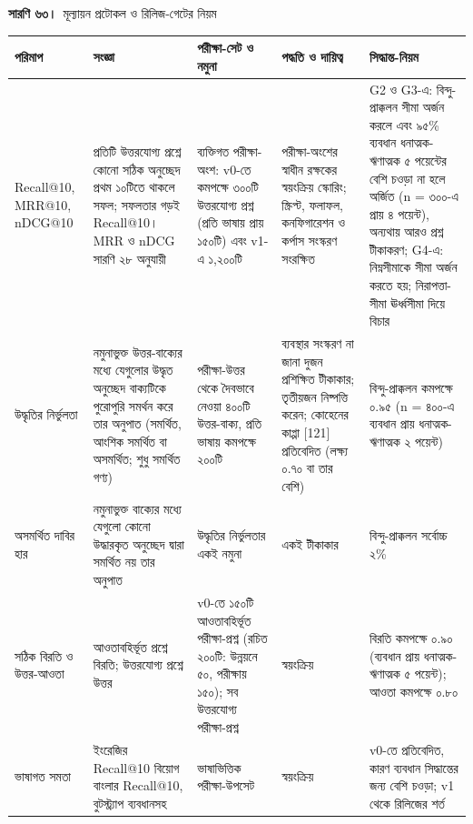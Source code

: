 \documentclass[border=10pt]{standalone}
\begin{document}
\begin{minipage}{17cm}
{\large\bfseries সারণি ৬৩।}\ {\large মূল্যায়ন প্রটোকল ও রিলিজ-গেটের নিয়ম}\par\vspace{7pt}
\small
{}
\begin{tabularx}{\linewidth}{@{}>{\hsize=0.714\hsize\raggedright\arraybackslash}X>{\hsize=1.238\hsize\raggedright\arraybackslash}X>{\hsize=1.048\hsize\raggedright\arraybackslash}X>{\hsize=0.952\hsize\raggedright\arraybackslash}X>{\hsize=1.048\hsize\raggedright\arraybackslash}X@{}}
\arrayrulecolor{bapilrule}\toprule
\rowcolor{white}\textbf{পরিমাপ} & \textbf{সংজ্ঞা} & \textbf{পরীক্ষা-সেট ও নমুনা} & \textbf{পদ্ধতি ও দায়িত্ব} & \textbf{সিদ্ধান্ত-নিয়ম} \\
\midrule
Recall@10, MRR@10, nDCG@10 & প্রতিটি উত্তরযোগ্য প্রশ্নে কোনো সঠিক অনুচ্ছেদ প্রথম ১০টিতে থাকলে সফল; সফলতার গড়ই Recall@10। MRR ও nDCG সারণি ২৮ অনুযায়ী & ব্যক্তিগত পরীক্ষা-অংশ: v0-তে কমপক্ষে ৩০০টি উত্তরযোগ্য প্রশ্ন (প্রতি ভাষায় প্রায় ১৫০টি) এবং v1-এ ১,২০০টি & পরীক্ষা-অংশের স্বাধীন রক্ষকের স্বয়ংক্রিয় স্কোরিং; স্ক্রিপ্ট, ফলাফল, কনফিগারেশন ও কর্পাস সংস্করণ সংরক্ষিত & G2 ও G3-এ: বিন্দু-প্রাক্কলন সীমা অর্জন করলে এবং ৯৫\% ব্যবধান ধনাত্মক-ঋণাত্মক ৫ পয়েন্টের বেশি চওড়া না হলে অর্জিত (n = ৩০০-এ প্রায় ৪ পয়েন্ট), অন্যথায় আরও প্রশ্ন টীকাকরণ; G4-এ: নিম্নসীমাকে সীমা অর্জন করতে হয়; নিরাপত্তা-সীমা ঊর্ধ্বসীমা দিয়ে বিচার \\
উদ্ধৃতির নির্ভুলতা & নমুনাভুক্ত উত্তর-বাক্যের মধ্যে যেগুলোর উদ্ধৃত অনুচ্ছেদ বাক্যটিকে পুরোপুরি সমর্থন করে তার অনুপাত (সমর্থিত, আংশিক সমর্থিত বা অসমর্থিত; শুধু সমর্থিত গণ্য) & পরীক্ষা-উত্তর থেকে দৈবভাবে নেওয়া ৪০০টি উত্তর-বাক্য, প্রতি ভাষায় কমপক্ষে ২০০টি & ব্যবস্থার সংস্করণ না জানা দুজন প্রশিক্ষিত টীকাকার; তৃতীয়জন নিষ্পত্তি করেন; কোহেনের কাপ্পা [121] প্রতিবেদিত (লক্ষ্য ০.৭০ বা তার বেশি) & বিন্দু-প্রাক্কলন কমপক্ষে ০.৯৫ (n = ৪০০-এ ব্যবধান প্রায় ধনাত্মক-ঋণাত্মক ২ পয়েন্ট) \\
অসমর্থিত দাবির হার & নমুনাভুক্ত বাক্যের মধ্যে যেগুলো কোনো উদ্ধারকৃত অনুচ্ছেদ দ্বারা সমর্থিত নয় তার অনুপাত & উদ্ধৃতির নির্ভুলতার একই নমুনা & একই টীকাকার & বিন্দু-প্রাক্কলন সর্বোচ্চ ২\% \\
সঠিক বিরতি ও উত্তর-আওতা & আওতাবহির্ভূত প্রশ্নে বিরতি; উত্তরযোগ্য প্রশ্নে উত্তর & v0-তে ১৫০টি আওতাবহির্ভূত পরীক্ষা-প্রশ্ন (রচিত ২০০টি: উন্নয়নে ৫০, পরীক্ষায় ১৫০); সব উত্তরযোগ্য পরীক্ষা-প্রশ্ন & স্বয়ংক্রিয় & বিরতি কমপক্ষে ০.৯০ (ব্যবধান প্রায় ধনাত্মক-ঋণাত্মক ৫ পয়েন্ট); আওতা কমপক্ষে ০.৮০ \\
ভাষাগত সমতা & ইংরেজির Recall@10 বিয়োগ বাংলার Recall@10, বুটস্ট্র্যাপ ব্যবধানসহ & ভাষাভিত্তিক পরীক্ষা-উপসেট & স্বয়ংক্রিয় & v0-তে প্রতিবেদিত, কারণ ব্যবধান সিদ্ধান্তের জন্য বেশি চওড়া; v1 থেকে রিলিজের শর্ত \\

\end{tabularx}
\end{minipage}
\end{document}
